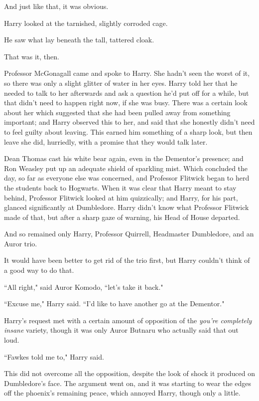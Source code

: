 And just like that, it was obvious.

Harry looked at the tarnished, slightly corroded cage.

He saw what lay beneath the tall, tattered cloak.

That was it, then.

Professor McGonagall came and spoke to Harry. She hadn't seen the worst of it, so there was only a slight glitter of water in her eyes. Harry told her that he needed to talk to her afterwards and ask a question he'd put off for a while, but that didn't need to happen right now, if she was busy. There was a certain look about her which suggested that she had been pulled away from something important; and Harry observed this to her, and said that she honestly didn't need to feel guilty about leaving. This earned him something of a sharp look, but then leave she did, hurriedly, with a promise that they would talk later.

Dean Thomas cast his white bear again, even in the Dementor's presence; and Ron Weasley put up an adequate shield of sparkling mist. Which concluded the day, so far as everyone else was concerned, and Professor Flitwick began to herd the students back to Hogwarts. When it was clear that Harry meant to stay behind, Professor Flitwick looked at him quizzically; and Harry, for his part, glanced significantly at Dumbledore. Harry didn't know what Professor Flitwick made of that, but after a sharp gaze of warning, his Head of House departed.

And so remained only Harry, Professor Quirrell, Headmaster Dumbledore, and an Auror trio.

It would have been better to get rid of the trio first, but Harry couldn't think of a good way to do that.

``All right," said Auror Komodo, ``let's take it back."

``Excuse me," Harry said. ``I'd like to have another go at the Dementor."

\later

Harry's request met with a certain amount of opposition of the \emph{you're completely insane} variety, though it was only Auror Butnaru who actually said that out loud.

``Fawkes told me to," Harry said.

This did not overcome all the opposition, despite the look of shock it produced on Dumbledore's face. The argument went on, and it was starting to wear the edges off the phoenix's remaining peace, which annoyed Harry, though only a little.

